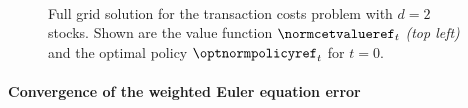 \begin{figure}
  \hfill%
  \hfill%
  \\[0mm]%
  \hfill%
  \hfill%
  \caption[Reference solution for the two-dimensional TCP]{%
    Full grid solution for the transaction costs problem
    with $d = 2$ stocks.
    Shown are the value function $\normcetvalueref_t$ \emph{(top left)} and the
    optimal policy $\optnormpolicyref_t$ for $t = 0$.%
  }%
  \label{fig:financeSolution2DReference}%
\end{figure}

\paragraph{Convergence of the weighted Euler equation error}

